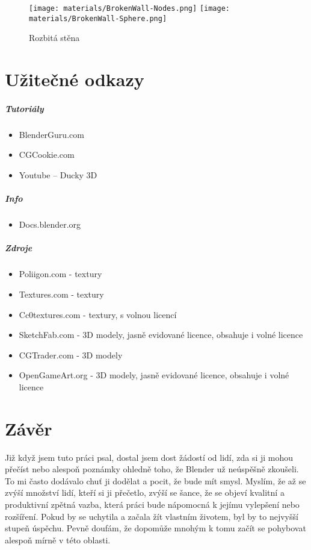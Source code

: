 \documentclass[12pt,a4paper]{report}
\begin{document}
	\begin{figure}[h]
		\centering
		\texttt{[image: materials/BrokenWall-Nodes.png]}
		\texttt{[image: materials/BrokenWall-Sphere.png]}
		\caption{Rozbitá stěna}
		\label{pic:material-wall}
	\end{figure}
	
	\chapter{Užitečné odkazy}
	\paragraph{Tutoriály}
	\begin{itemize}
	\item BlenderGuru.com
	\item CGCookie.com
	\item Youtube – Ducky 3D
	\end{itemize}
	\paragraph{Info}
	\begin{itemize}
	\item Docs.blender.org
	\end{itemize}
	\paragraph{Zdroje}
	\begin{itemize}
	\item Poliigon.com - textury
	\item Textures.com - textury
	\item Cc0textures.com - textury, s volnou licencí
	\item SketchFab.com - 3D modely, jasně evidované licence, obsahuje i volné
	licence
	\item CGTrader.com - 3D modely
	\item OpenGameArt.org - 3D modely, jasně evidované licence, obsahuje i volné
	licence
	\end{itemize}
	
	\chapter{Závěr}
	Již když jsem tuto práci psal, dostal jsem dost žádostí od lidí, zda si ji
	mohou přečíst nebo alespoň poznámky ohledně toho, že Blender už
	neúspěšně zkoušeli. To mi často dodávalo chuť ji dodělat a pocit, že bude
	mít smysl. Myslím, že až se zvýší množství lidí, kteří si ji přečetlo, zvýší se
	šance, že se objeví kvalitní a produktivní zpětná vazba, která práci bude
	nápomocná k jejímu vylepšení nebo rozšíření. Pokud by se uchytila a
	začala žít vlastním životem, byl by to nejvyšší stupeň úspěchu. Pevně
	doufám, že dopomůže mnohým k tomu začít se pohybovat alespoň mírně
	v této oblasti.
	
	
	

	
\end{document}
